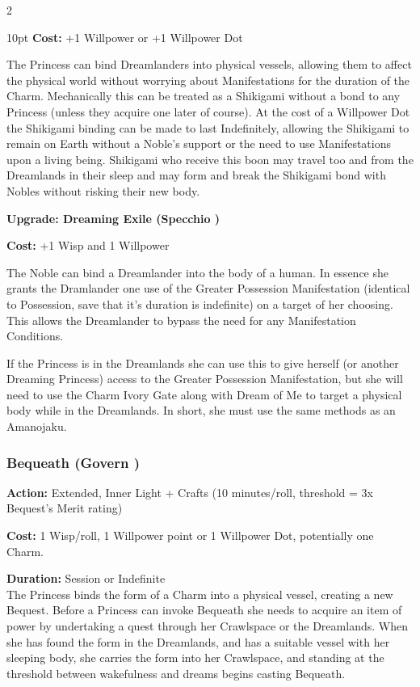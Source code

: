 \begin{multicols}{2}
\begin{myindentpar}{10pt}
\noindent \textbf{Cost:} +1 Willpower or +1 Willpower Dot

The Princess can bind Dreamlanders into physical vessels, allowing them to affect the physical world without worrying about Manifestations for the duration of the Charm. Mechanically this can be treated as a Shikigami without a bond to any Princess (unless they acquire one later of course). At the cost of a Willpower Dot the Shikigami binding can be made to last Indefinitely, allowing the Shikigami to remain on Earth without a Noble's support or the need to use Manifestations upon a living being. Shikigami who receive this boon may travel too and from the Dreamlands in their sleep and may form and break the Shikigami bond with Nobles without risking their new body. 

\textbf{Upgrade: Dreaming Exile (Specchio \textbullet\textbullet)}

\textbf{Cost:} +1 Wisp and 1 Willpower

The Noble can bind a Dreamlander into the body of a human. In essence she grants the Dramlander one use of the Greater Possession Manifestation (identical to Possession, save that it's duration is indefinite) on a target of her choosing. This allows the Dreamlander to bypass the need for any Manifestation Conditions. 

If the Princess is in the Dreamlands she can use this to give herself (or another Dreaming Princess) access to the Greater Possession Manifestation, but she will need to use the Charm Ivory Gate along with Dream of Me to target a physical body while in the Dreamlands. In short, she must use the same methods as an Amanojaku.

\end{myindentpar}

\subsubsection*{Bequeath (Govern \textbullet\textbullet\textbullet)}

\noindent \textbf{Action:} Extended, Inner Light + Crafts (10 minutes/roll, threshold = 3x Bequest's Merit rating)

\noindent \textbf{Cost:} 1 Wisp/roll, 1 Willpower point or 1 Willpower Dot, potentially one Charm. 

\noindent \textbf{Duration:} Session or Indefinite \\

\noindent The Princess binds the form of a Charm into a physical vessel, creating a new Bequest. Before a Princess can invoke Bequeath she needs to acquire an item of power by undertaking a quest through her Crawlspace or the Dreamlands. When she has found the form in the Dreamlands, and has a suitable vessel with her sleeping body, she carries the form into her Crawlspace, and standing at the threshold between wakefulness and dreams begins casting Bequeath.


\end{multicols}
